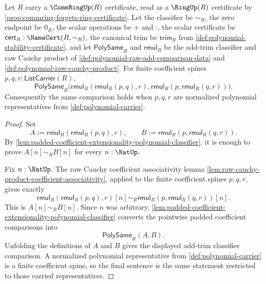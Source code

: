 \begin{theorem}
\label{thm:polynomial-raw-multiplication-associativity-up-to-add-trim}
Let $R$ carry a $\CommRingUp(R)$ certificate, read as a $\RingUp(R)$ certificate by \autoref{prop:commring-forgets-ring-certificate}. Let the classifier be $\sim_R$, the zero endpoint be $0_R$, the scalar operations be $+$ and $\cdot$, the scalar certificate be $\mathsf{cert}_R:\NameCert(R,\sim_R)$, the canonical trim be $\mathsf{trim}_R$ from \autoref{def:polynomial-stability-certificate}, and let $\mathsf{PolySame}_R$ and $\mathsf{rmul}_R$ be the add-trim classifier and raw Cauchy product of \autoref{def:polynomial-raw-add-comparison-data} and \autoref{def:polynomial-raw-cauchy-product}. For finite coefficient spines $p,q,r:\mathsf{ListCarrier}(R)$,
$$
\mathsf{PolySame}_R\bigl(\mathsf{rmul}_R(\mathsf{rmul}_R(p,q),r),\mathsf{rmul}_R(p,\mathsf{rmul}_R(q,r))\bigr).
$$
Consequently the same comparison holds when $p,q,r$ are normalized polynomial representatives from \autoref{def:polynomial-carrier}.
\end{theorem}
\begin{proof}
Set
$$
A:=\mathsf{rmul}_R(\mathsf{rmul}_R(p,q),r),
\qquad
B:=\mathsf{rmul}_R(p,\mathsf{rmul}_R(q,r)).
$$
By \autoref{lem:padded-coefficient-extensionality-polynomial-classifier}, it is enough to prove $A[n]\sim_RB[n]$ for every $n:\NatUp$.

Fix $n:\NatUp$. The raw Cauchy coefficient associativity lemma \autoref{lem:raw-cauchy-product-coefficient-associativity}, applied to the finite coefficient spines $p,q,r$, gives exactly
$$
\mathsf{rmul}_R(\mathsf{rmul}_R(p,q),r)[n]
\sim_R
\mathsf{rmul}_R(p,\mathsf{rmul}_R(q,r))[n].
$$
This is $A[n]\sim_RB[n]$. Since $n$ was arbitrary, \autoref{lem:padded-coefficient-extensionality-polynomial-classifier} converts the pointwise padded coefficient comparisons into
$$
\mathsf{PolySame}_R(A,B).
$$
Unfolding the definitions of $A$ and $B$ gives the displayed add-trim classifier comparison. A normalized polynomial representative from \autoref{def:polynomial-carrier} is a finite coefficient spine, so the final sentence is the same statement restricted to those carried representatives.
\end{proof}
